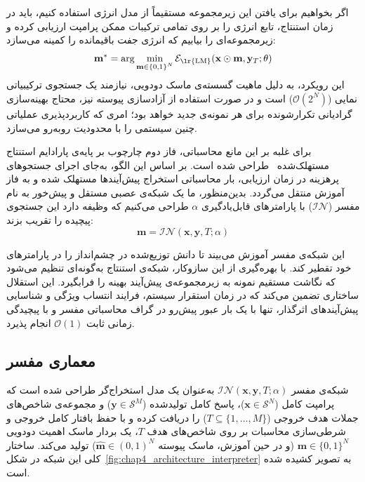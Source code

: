 اگر بخواهیم برای یافتن این زیرمجموعه مستقیماً از مدل انرژی استفاده کنیم، باید در زمان استنتاج، تابع انرژی را بر روی تمامی ترکیبات ممکن پرامپت ارزیابی کرده و زیرمجموعه‌ای را بیابیم که انرژی جفت باقیمانده را کمینه می‌سازد:
\begin{equation}\label{eq:chap4_combinatorial_search}
    \mathbf{m}^* = \arg\min_{\mathbf{m} \in {\{0, 1\}}^N} \mathcal{E}_{\text{\lr{LM}}}(\mathbf{x} \odot \mathbf{m}, \mathbf{y}_T; \theta)
\end{equation}
این رویکرد، به دلیل ماهیت گسسته‌ی ماسک دودویی، نیازمند یک جستجوی ترکیبیاتی نمایی ($\mathcal{O}(2^N)$) است و در صورت استفاده از آزادسازی پیوسته نیز، محتاج بهینه‌سازی گرادیانی تکرارشونده برای هر نمونه‌ی جدید خواهد بود؛ امری که کاربردپذیری عملیاتی چنین سیستمی را با محدودیت روبه‌رو می‌سازد.

برای غلبه بر این مانع محاسباتی، فاز دوم چارچوب  بر پایه‌ی پارادایم استنتاج مستهلک‌شده~\cite{tu2018learning} طراحی شده است. بر اساس این الگو، به‌جای اجرای جستجوهای پرهزینه در زمان ارزیابی، بار محاسباتی استخراج پیش‌آیندها مستهلک شده و به فاز آموزش منتقل می‌گردد. بدین‌منظور، ما یک شبکه‌ی عصبی مستقل و پیش‌خور به نام مفسر ($\mathcal{IN}$) با پارامترهای قابل‌یادگیری $\alpha$ طراحی می‌کنیم که وظیفه دارد این جستجوی پیچیده را تقریب بزند:
\begin{equation}
    \mathbf{m} = \mathcal{IN}(\mathbf{x}, \mathbf{y}, T; \alpha)
\end{equation}

این شبکه‌ی مفسر آموزش می‌بیند تا دانش توزیع‌شده در چشم‌انداز  را در پارامترهای خود تقطیر کند. با بهره‌گیری از این سازوکار، شبکه‌ی استنتاج به‌گونه‌ای تنظیم می‌شود که نگاشت مستقیم نمونه به زیرمجموعه‌ی پیش‌آیند بهینه را فرابگیرد. این استقلال ساختاری تضمین می‌کند که در زمان استقرار سیستم، فرایند انتساب ویژگی و شناسایی پیش‌آیندهای اثرگذار، تنها با یک بار عبور پیش‌رو در گراف محاسباتی مفسر و با پیچیدگی زمانی ثابت $\mathcal{O}(1)$ انجام پذیرد.


\subsection{معماری مفسر}\label{sec:4-4-1}

شبکه‌ی مفسر $\mathcal{IN}(\mathbf{x}, \mathbf{y}, T; \alpha)$ به‌عنوان یک مدل استخراج‌گر طراحی شده است که پرامپت کامل ($\mathbf{x} \in \mathcal{S}^N$)، پاسخ کامل تولیدشده ($\mathbf{y} \in \mathcal{S}^M$) و مجموعه‌ی شاخص‌های جملات هدف خروجی ($T \subseteq \{1, \dots, M\}$) را دریافت کرده و با حفظ بافتار کامل خروجی و شرطی‌سازی محاسبات بر روی شاخص‌های هدف $T$، یک بردار ماسک اهمیت دودویی $\mathbf{m} \in {\{0, 1\}}^N$ (و در حین آموزش، ماسک پیوسته $\hat{\mathbf{m}} \in {(0, 1)}^N$) تولید می‌کند. ساختار کلی این شبکه در شکل~\ref{fig:chap4_architecture_interpreter} به تصویر کشیده شده است.

